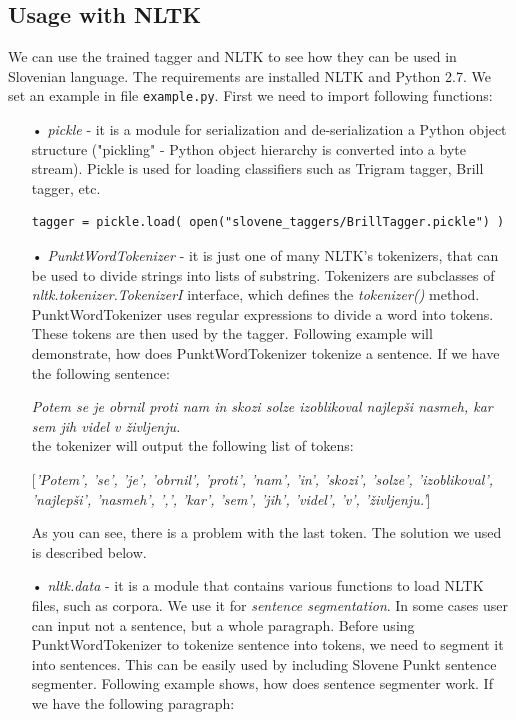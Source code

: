\documentclass[10pt, conference, compsocconf]{IEEEtran}
\begin{document}
\subsection{Usage with NLTK} %

We can use the trained tagger and NLTK to see how they can be used in Slovenian language. The requirements are installed NLTK and Python 2.7. We set an example in file \texttt{example.py}.
First we need to import following functions:
\begin{itemize}
\item[•] \textit{pickle} - it is a module for serialization and de-serialization a Python object structure ("pickling" - Python object hierarchy is converted into a byte stream). Pickle is used for loading classifiers such as Trigram tagger, Brill tagger, etc.
\begin{lstlisting}
tagger = pickle.load( open("slovene_taggers/BrillTagger.pickle") )
\end{lstlisting}

\item[•] \textit{PunktWordTokenizer} \cite{tokenizer} - it is just one of many NLTK's tokenizers, that can be used to divide strings into lists of substring. Tokenizers are subclasses of \textit{nltk.tokenizer.TokenizerI} interface, which defines the \textit{tokenizer()} method. PunktWordTokenizer uses regular expressions to divide a word into tokens. These tokens are then used by the tagger. Following example will demonstrate, how does PunktWordTokenizer tokenize a sentence. If we have the following sentence:

\textit{Potem se je obrnil proti nam in skozi solze izoblikoval najlepši nasmeh, kar sem jih videl v življenju.}\\
the tokenizer will output the following list of tokens:

[\textit{'Potem', 'se', 'je', 'obrnil', 'proti', 'nam', 'in', 'skozi', 'solze', 'izoblikoval', 'najlepši', 'nasmeh', ',', 'kar', 'sem', 'jih', 'videl', 'v', 'življenju.'}]

As you can see, there is a problem with the last token. The solution we used is described below.

\item[•] \textit{nltk.data} - it is a module that contains various functions to load NLTK files, such as corpora. We use it for \textit{sentence segmentation}. In some cases user can input not a sentence, but a whole paragraph. Before using PunktWordTokenizer to tokenize sentence into tokens, we need to segment it into sentences. This can be easily used by including Slovene Punkt sentence segmenter. Following example shows, how does sentence segmenter work. If we have the following paragraph:


\end{itemize}
\end{document}
